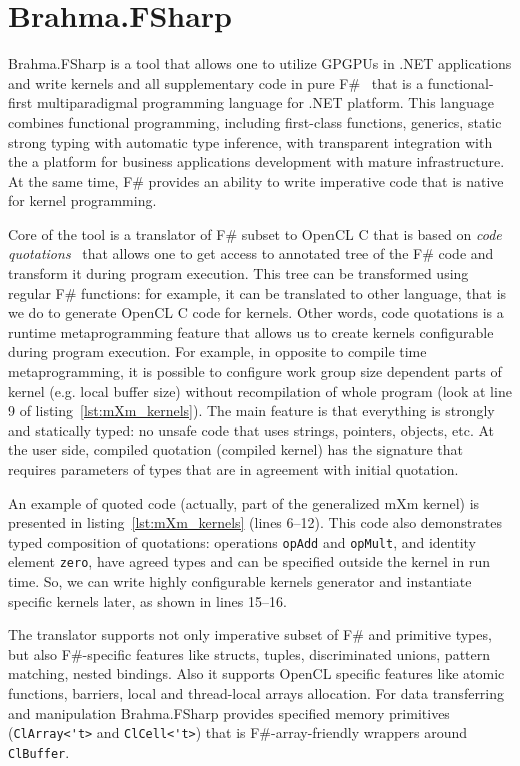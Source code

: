 \section{Brahma.FSharp}

Brahma.FSharp is a tool that allows one to utilize GPGPUs in .NET applications and write kernels and all supplementary code in pure F\#~\cite{fsharp} that is a functional-first multiparadigmal programming language for .NET platform.
This language combines functional programming, including first-class functions, generics, static strong typing with automatic type inference, with transparent integration with the a platform for business applications development with mature infrastructure.
At the same time, F\# provides an ability to write imperative code that is native for kernel programming.

Core of the tool is a translator of F\# subset to OpenCL C that is based on \emph{code quotations}~\cite{FSharpQuotations} that allows one to get access to annotated tree of the F\# code and transform it during program execution.
This tree can be transformed using regular F\# functions: for example, it can be translated to other language, that is we do to generate OpenCL C code for kernels.
Other words, code quotations is a runtime metaprogramming feature that allows us to create kernels configurable during program execution.
For example, in opposite to compile time metaprogramming, it is possible to configure work group size dependent parts of kernel (e.g. local buffer size) without recompilation of whole program (look at line 9 of listing~\ref{lst:mXm_kernels}).
The main feature is that everything is strongly and statically typed: no unsafe code that uses strings, pointers, objects, etc.
At the user side, compiled quotation (compiled kernel) has the signature that requires parameters of types that are in agreement with initial quotation.

An example of quoted code (actually, part of the generalized mXm kernel) is presented in listing~\ref{lst:mXm_kernels} (lines 6--12).
This code also demonstrates typed composition of quotations: operations \verb|opAdd| and \verb|opMult|, and identity element \verb|zero|, have agreed types and can be specified outside the kernel in run time.
So, we can write highly configurable kernels generator and instantiate specific kernels later, as shown in lines 15--16.

The translator supports not only imperative subset of F\# and primitive types, but also F\#-specific features like structs, tuples, discriminated unions, pattern matching, nested bindings.
Also it supports OpenCL specific features like atomic functions, barriers, local and thread-local arrays allocation.
For data transferring and manipulation Brahma.FSharp provides specified memory primitives (\verb|ClArray<'t>| and \verb|ClCell<'t>|) that is F\#-array-friendly wrappers around \texttt{ClBuffer}.

